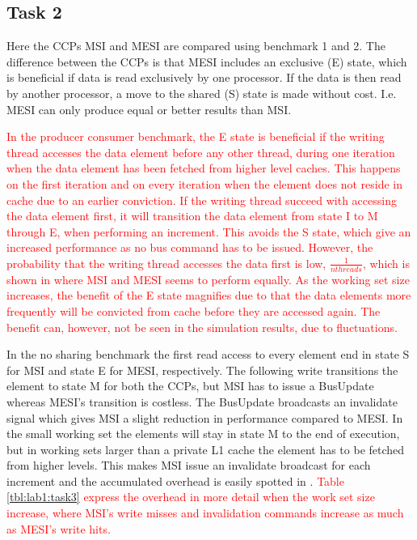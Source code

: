 \subsection{Task 2}
\label{sec:lab12}
Here the CCPs MSI and MESI are compared using benchmark 1 and 2. The difference between the CCPs is that MESI includes an exclusive (E) state, which is beneficial if data is read exclusively by one processor. If the data is then read by another processor, a move to the shared (S) state is made without cost. I.e. MESI can only produce equal or better results than MSI.

\textcolor{red}{In the producer consumer benchmark, the E state is beneficial if the writing thread accesses the data element before any other thread, during one iteration when the data element has been fetched from higher level caches. This happens on the first iteration and on every iteration when the element does not reside in cache due to an earlier conviction. If the writing thread succeed with accessing the data element first, it will transition the data element from state I to M through E, when performing an increment. This avoids the S state, which give an increased performance as no bus command has to be issued. However, the probability that the writing thread accesses the data first is low, $\frac{1}{nthreads}$, which is shown in  where MSI and MESI seems to perform equally. As the working set size increases, the benefit of the E state magnifies due to that the data elements more frequently will be convicted from cache before they are accessed again. The benefit can, however, not be seen in the simulation results, due to fluctuations.}

In the no sharing benchmark the first read access to every element end in state S for MSI and state E for MESI, respectively. The following write transitions the element to state M for both the CCPs, but MSI has to issue a BusUpdate whereas MESI's transition is costless. The BusUpdate broadcasts an invalidate signal which gives MSI a slight reduction in performance compared to MESI. In the small working set the elements will stay in state M to the end of execution, but in working sets larger than a private L1 cache the element has to be fetched from higher levels. This makes MSI issue an invalidate broadcast for each increment and the accumulated overhead is easily spotted in . \textcolor{red}{Table \ref{tbl:lab1:task3} express the overhead in more detail when the work set size increase, where MSI's write misses and invalidation commands increase as much as MESI's write hits.}

